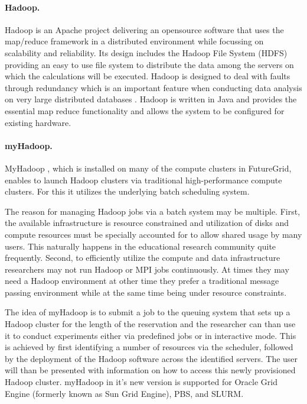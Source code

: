 \documentclass{article}
\begin{document}
\paragraph{Hadoop.}\label{S:hadoop}

Hadoop \cite{www/hadoop} is an Apache project delivering an opensource software that uses the map/reduce framework in a distributed environment while focussing on scalability and reliability. Its design includes the Hadoop File System (HDFS) providing an easy to use file system to distribute the data among the servers on which the calculations will be executed. Hadoop is designed to deal with faults through redundancy which is an important feature when conducting data analysis on very large distributed databases \cite{www/hadoop}.  Hadoop is written in Java and provides the essential map reduce functionality and allows the system to be configured for existing hardware.

\paragraph{myHadoop.}

MyHadoop \cite{report/myhadoop}\cite{myhadoop2}, which is installed on many of the compute clusters in FutureGrid, enables to launch Hadoop clusters via traditional high-performance compute clusters. For this it utilizes the underlying batch scheduling system.

The reason for managing Hadoop jobs via a batch system may be multiple. First, the available infrastructure is resource constrained and utilization of disks and compute resources must be specially accounted for to allow shared usage by many users. This naturally happens in the educational research community quite frequently.  Second, to efficiently utilize the compute and data infrastructure researchers may not run Hadoop or MPI jobs continuously. At times they may need a Hadoop environment at other time they prefer a traditional message passing environment while at the same time being under resource constraints.

The idea of myHadoop is to submit a job to the queuing system that sets up a Hadoop cluster for the length of the reservation and the researcher can than use it to conduct experiments either via predefined jobs or in interactive mode. This is achieved by first identifying a number of resources via the scheduler, followed by the deployment of the Hadoop software across the identified servers. The user will than be presented with information on how to access this newly provisioned Hadoop cluster. myHadoop in it's new version \cite{myhadoop2} is supported for Oracle Grid Engine (formerly known as Sun Grid Engine), PBS, and SLURM.
\end{document}
